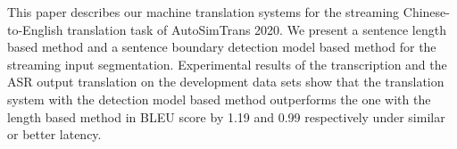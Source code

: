 This paper describes our machine translation systems for the streaming Chinese-to-English translation task of AutoSimTrans 2020. We present a sentence length based method and a sentence boundary detection model based method for the streaming input segmentation. Experimental results of the transcription and the ASR output translation on the development data sets show that the translation system with the detection model based method outperforms the one with the length based method in BLEU score by 1.19 and 0.99 respectively under similar or better latency.
